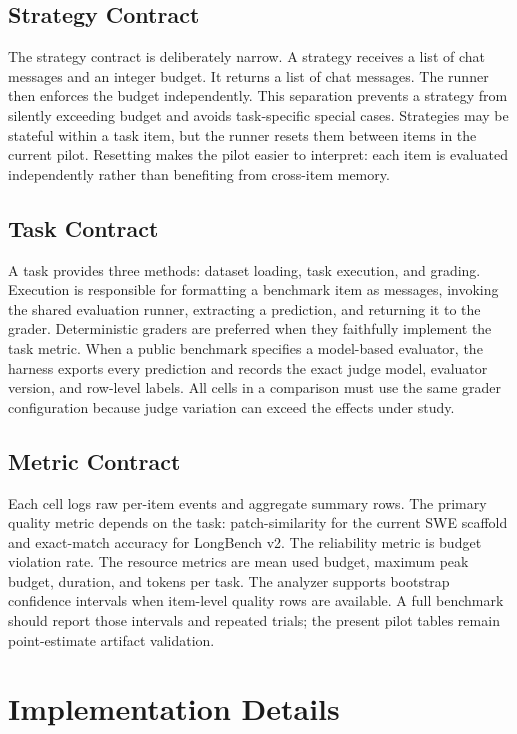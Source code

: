 \documentclass[11pt]{article}
\begin{document}
\subsection{Strategy Contract}

The strategy contract is deliberately narrow.  A strategy receives a list of
chat messages and an integer budget.  It returns a list of chat messages.  The
runner then enforces the budget independently.  This separation prevents a
strategy from silently exceeding budget and avoids task-specific special cases.
Strategies may be stateful within a task item, but the runner resets them
between items in the current pilot.  Resetting makes the pilot easier to
interpret: each item is evaluated independently rather than benefiting from
cross-item memory.

\subsection{Task Contract}

A task provides three methods: dataset loading, task execution, and grading.
Execution is responsible for formatting a benchmark item as messages, invoking
the shared evaluation runner, extracting a prediction, and returning it to the
grader.  Deterministic graders are preferred when they faithfully implement
the task metric.  When a public benchmark specifies a model-based evaluator,
the harness exports every prediction and records the exact judge model,
evaluator version, and row-level labels.  All cells in a comparison must use
the same grader configuration because judge variation can exceed the effects
under study.

\subsection{Metric Contract}

Each cell logs raw per-item events and aggregate summary rows.  The primary
quality metric depends on the task: patch-similarity for the current SWE
scaffold and exact-match accuracy for LongBench v2.  The reliability metric is
budget violation rate.  The resource metrics are mean used budget, maximum peak
budget, duration, and tokens per task.  The analyzer supports bootstrap
confidence intervals when item-level quality rows are available.  A full
benchmark should report those intervals and repeated trials; the present pilot
tables remain point-estimate artifact validation.

\section{Implementation Details}
\end{document}
